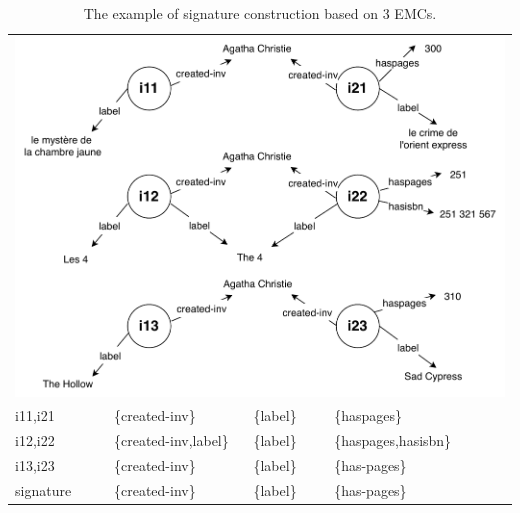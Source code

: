 \documentclass[runningheads]{llncs}
\begin{document}
\begin{table}[]
    \centering
    \begin{tabular}{llll}
        \multicolumn{4}{l}{\includegraphics[scale=0.7]{./agatha.pdf}} \\
         i11,i21 & \{created-inv\}& \{label\}&\{haspages\} \\
         i12,i22 & \{created-inv,label\}&\{label\} &\{haspages,hasisbn\} \\
         i13,i23 & \{created-inv\}&\{label\}&\{has-pages\}\\
        \hline
        
        signature & \{created-inv\}&\{label\}&\{has-pages\} \\
        
    \end{tabular}
    \caption{The example of signature construction based on 3 EMCs.}
    \label{tab:signature_example}
\end{table}
\end{document}
